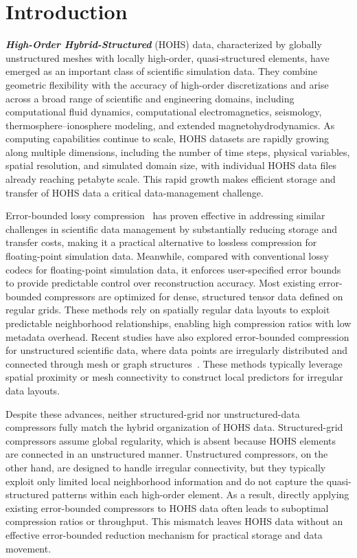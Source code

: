 \section{Introduction}

\textit{\textbf{High-Order Hybrid-Structured}} (HOHS) data, characterized by globally unstructured meshes with locally high-order, quasi-structured elements, have emerged as an important class of scientific simulation data. They combine geometric flexibility with the accuracy of high-order discretizations and arise across a broad range of scientific and engineering domains, including computational fluid dynamics, computational electromagnetics, seismology, thermosphere--ionosphere modeling, and extended magnetohydrodynamics. As computing capabilities continue to scale, HOHS datasets are rapidly growing along multiple dimensions, including the number of time steps, physical variables, spatial resolution, and simulated domain size, with individual HOHS data files already reaching petabyte scale. This rapid growth makes efficient storage and transfer of HOHS data a critical data-management challenge.

Error-bounded lossy compression~\cite{liang2018error,liu2024high,zhao2021optimizing,liang2022sz3,lindstrom2014fixed,li2023lossy,di2025survey,huang2023cuszp,gong2023mgard} has proven effective in addressing similar challenges in scientific data management by substantially reducing storage and transfer costs, making it a practical alternative to lossless compression for floating-point simulation data. Meanwhile, compared with conventional lossy codecs for floating-point simulation data, it enforces user-specified error bounds to provide predictable control over reconstruction accuracy.
Most existing error-bounded compressors are optimized for dense, structured tensor data defined on regular grids. These methods rely on spatially regular data layouts to exploit predictable neighborhood relationships, enabling high compression ratios with low metadata overhead. Recent studies have also explored error-bounded compression for unstructured scientific data, where data points are irregularly distributed and connected through mesh or graph structures~\cite{wu2025enabling,gong2024general,ren2024prediction}. These methods typically leverage spatial proximity or mesh connectivity to construct local predictors for irregular data layouts.

Despite these advances, neither structured-grid nor unstructured-data compressors fully match the hybrid organization of HOHS data. Structured-grid compressors assume global regularity, which is absent because HOHS elements are connected in an unstructured manner. Unstructured compressors, on the other hand, are designed to handle irregular connectivity, but they typically exploit only limited local neighborhood information and do not capture the quasi-structured patterns within each high-order element. As a result, directly applying existing error-bounded compressors to HOHS data often leads to suboptimal compression ratios or throughput. This mismatch leaves HOHS data without an effective error-bounded reduction mechanism for practical storage and data movement.

